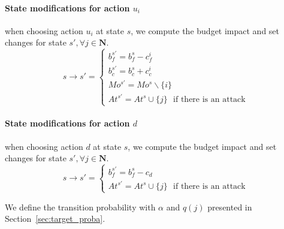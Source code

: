 \paragraph*{\textbf{State modifications for action $u_i$}}
when choosing action $u_i$ at state $s$, we compute the budget impact and set changes for state $s', \forall j \in \textbf{N}$. 
\begin{equation}
  s \longrightarrow s' =\begin{cases}
    b_f^{s'} = b_f^s - c_f^i\\
    b_c^{s'} = b_c^s + c_c^ i\\
    Mo^{s'} = Mo^s \backslash\{i\}\\
    At^{s'} = At^s \cup \{j\}\text{~~if there is an attack}
  \end{cases}
\end{equation}

\paragraph*{\textbf{State modifications for action $d$}}
when choosing action $d$ at state $s$, we compute the budget impact and set changes for state $s', \forall j \in \textbf{N}$. 
\begin{equation}
  s \longrightarrow s' =\begin{cases}
    b_f^{s'} = b_f^s - c_d\\
    At^{s'} = At^s \cup \{j\}\text{~~if there is an attack}
  \end{cases}
\end{equation}


We define the transition probability with $\alpha$ and $q(j)$ presented in Section~\ref{sec:target_proba}.


